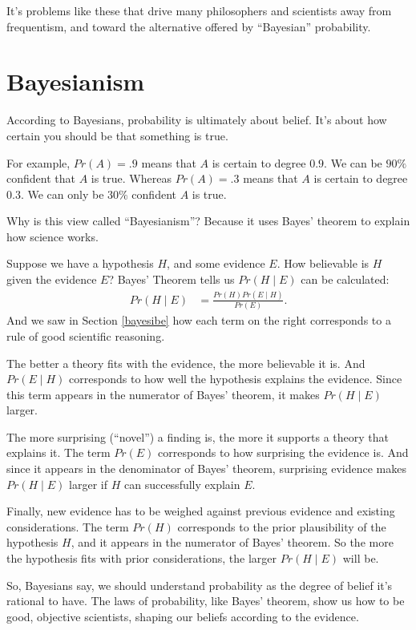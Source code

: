 \documentclass[justified]{tufte-book}
\newcommand{\given}{\mid}
\newcommand{\p}{Pr}
\theoremstyle{definition}
\theoremstyle{definition}
\theoremstyle{definition}
\theoremstyle{definition}
\theoremstyle{remark}
\begin{document}
It's problems like these that drive many philosophers and scientists away from frequentism, and toward the alternative offered by ``Bayesian'' probability.

\hypertarget{bayesianism}{%
\section{Bayesianism}\label{bayesianism}}

According to Bayesians, probability is ultimately about belief. It's about how certain you should be that something is true.

For example, \(\p(A)=.9\) means that \(A\) is certain to degree \(0.9\). We can be \(90\%\) confident that \(A\) is true. Whereas \(\p(A)=.3\) means that \(A\) is certain to degree \(0.3\). We can only be \(30\%\) confident \(A\) is true.

Why is this view called ``Bayesianism''? Because it uses Bayes' theorem to explain how science works.

Suppose we have a hypothesis \(H\), and some evidence \(E\). How believable is \(H\) given the evidence \(E\)? Bayes' Theorem tells us \(\p(H \given E)\) can be calculated:
\[
  \begin{aligned}
    \p(H \given E) &= \frac{\p(H)\p(E \given H)}{\p(E)}.
  \end{aligned}
\]
And we saw in Section \ref{bayesibe} how each term on the right corresponds to a rule of good scientific reasoning.

The better a theory fits with the evidence, the more believable it is. And \(\p(E \given H)\) corresponds to how well the hypothesis explains the evidence. Since this term appears in the numerator of Bayes' theorem, it makes \(\p(H \given E)\) larger.

The more surprising (``novel'') a finding is, the more it supports a theory that explains it. The term \(\p(E)\) corresponds to how surprising the evidence is. And since it appears in the denominator of Bayes' theorem, surprising evidence makes \(\p(H \given E)\) larger if \(H\) can successfully explain \(E\).

Finally, new evidence has to be weighed against previous evidence and existing considerations. The term \(\p(H)\) corresponds to the prior plausibility of the hypothesis \(H\), and it appears in the numerator of Bayes' theorem. So the more the hypothesis fits with prior considerations, the larger \(\p(H \given E)\) will be.

So, Bayesians say, we should understand probability as the degree of belief it's rational to have. The laws of probability, like Bayes' theorem, show us how to be good, objective scientists, shaping our beliefs according to the evidence.
\end{document}
